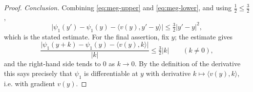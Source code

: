 \begin{proof}
\emph{Conclusion.}
Combining \eqref{eq:meg-upper} and \eqref{eq:meg-lower}, and using
$\tfrac12\le\tfrac32$,
\[
  \bigl|\psi_1(y')-\psi_1(y)-\langle v(y),y'-y\rangle\bigr|\le\tfrac32|y'-y|^2 ,
\]
which is the stated estimate. For the final assertion, fix $y$; the estimate
gives
\[
  \frac{\bigl|\psi_1(y+k)-\psi_1(y)-\langle v(y),k\rangle\bigr|}{|k|}
   \le\tfrac32|k|\qquad(k\ne0),
\]
and the right-hand side tends to $0$ as $k\to0$. By the definition of the
derivative this says precisely that $\psi_1$ is differentiable at $y$ with
derivative $k\mapsto\langle v(y),k\rangle$, i.e. with gradient $v(y)$.
\end{proof}
